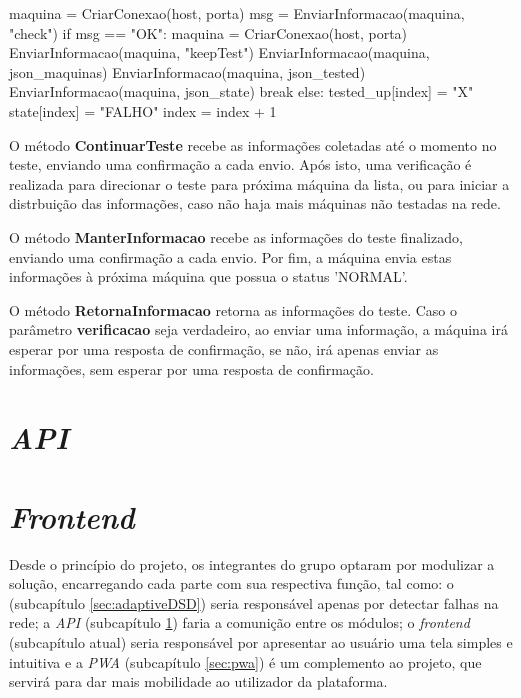 \vspace*{1cm}
\begin{python}
    maquina = CriarConexao(host, porta)
    msg = EnviarInformacao(maquina, "check")
    if msg == "OK":
        maquina = CriarConexao(host, porta)
        EnviarInformacao(maquina, "keepTest")
        EnviarInformacao(maquina, json_maquinas)
        EnviarInformacao(maquina, json_tested)
        EnviarInformacao(maquina, json_state)
        break
    else:
        tested_up[index] = "X"
        state[index] = "FALHO"
        index = index + 1
\end{python}
\vspace*{1cm}

O método \textbf{ContinuarTeste} recebe as informações coletadas até o momento no teste, enviando uma confirmação a cada envio. Após isto, uma verificação é realizada para direcionar 
o teste para próxima máquina da lista, ou para iniciar a distrbuição das informações, caso não haja mais máquinas não testadas na rede.

O método \textbf{ManterInformacao} recebe as informações do teste finalizado, enviando uma confirmação a cada envio. Por fim, a máquina envia estas informações à próxima máquina que possua o status 
'NORMAL'.

O método \textbf{RetornaInformacao} retorna as informações do teste. Caso o parâmetro \textbf{verificacao} seja verdadeiro, ao enviar uma informação, a máquina irá esperar por uma resposta 
de confirmação, se não, irá apenas enviar as informações, sem esperar por uma resposta de confirmação.




\section{\textit{API}}
\label{sec:api}









\section{\textit{Frontend}}
\label{sec:frontend}

Desde o princípio do projeto, os integrantes do grupo optaram por modulizar a solução, encarregando cada parte com sua respectiva função, tal como: o \adaptive{} (subcapítulo \ref{sec:adaptiveDSD}) seria responsável apenas por detectar falhas na rede; a \textit{API} (subcapítulo \ref{sec:api}) faria a comunição entre os módulos; o \textit{frontend} (subcapítulo atual) seria responsável por apresentar ao usuário uma tela simples e intuitiva e a \textit{PWA} (subcapítulo \ref{sec:pwa}) é um complemento ao projeto, que servirá para dar mais mobilidade ao utilizador da plataforma.

